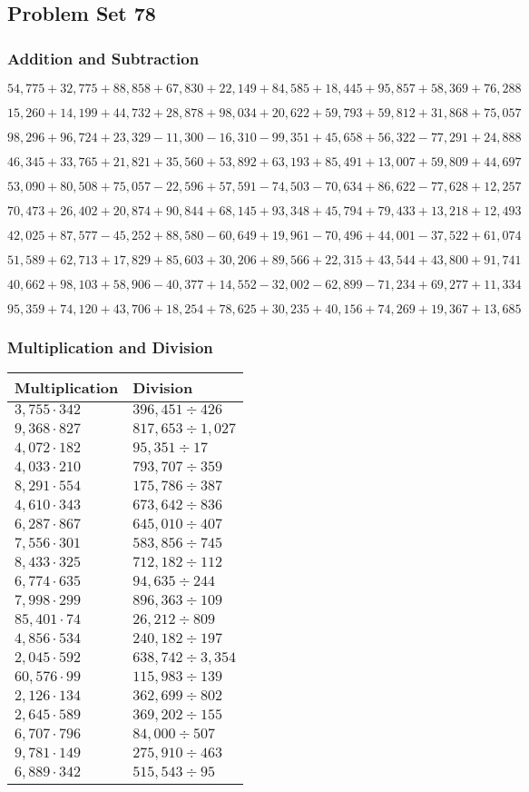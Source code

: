 \hypertarget{problem-set-78}{%
\subsection{Problem Set 78}\label{problem-set-78}}

\hypertarget{addition-and-subtraction-300}{%
\subsubsection{Addition and
Subtraction}\label{addition-and-subtraction-300}}

\(54,775+32,775+88,858+67,830+22,149+84,585+18,445+95,857+58,369+ 76,288\)

\(15,260+14,199+44,732+28,878+98,034+20,622+59,793+59,812+31,868+75,057\)

\(98,296+96,724+23,329-11,300-16,310-99,351+45,658+56,322-77,291+24,888\)

\(46,345+33,765+21,821+35,560+53,892+63,193+85,491+13,007+59,809+44,697\)

\(53,090+80,508+75,057-22,596+57,591-74,503-70,634+86,622-77,628+12,257\)

\(70,473+26,402+20,874+90,844+68,145+93,348+45,794+79,433+13,218+12,493\)

\(42,025+87,577-45,252+88,580-60,649+19,961-70,496+44,001-37,522+61,074\)

\(51,589+62,713+17,829+85,603+30,206+89,566+22,315+43,544+43,800+91,741\)

\(40,662+98,103+58,906-40,377+14,552-32,002-62,899-71,234+69,277+11,334\)

\(95,359+74,120+43,706+18,254+78,625+30,235+40,156+74,269+19,367+13,685\)

\hypertarget{multiplication-and-division-299}{%
\subsubsection{Multiplication and
Division}\label{multiplication-and-division-299}}

\begin{longtable}[]{@{}ll@{}}
\toprule
Multiplication & Division\tabularnewline
\midrule
\endhead
\(3,755\cdot342\) & \(396,451÷426\)\tabularnewline
\(9,368\cdot827\) & \(817,653÷1,027\)\tabularnewline
\(4,072\cdot182\) & \(95,351÷17\)\tabularnewline
\(4,033\cdot210\) & \(793,707÷359\)\tabularnewline
\(8,291\cdot554\) & \(175,786÷387\)\tabularnewline
\(4,610\cdot343\) & \(673,642÷836\)\tabularnewline
\(6,287\cdot867\) & \(645,010÷407\)\tabularnewline
\(7,556\cdot301\) & \(583,856÷745\)\tabularnewline
\(8,433\cdot325\) & \(712,182÷112\)\tabularnewline
\(6,774\cdot635\) & \(94,635÷244\)\tabularnewline
\(7,998\cdot299\) & \(896,363÷109\)\tabularnewline
\(85,401\cdot74\) & \(26,212÷809\)\tabularnewline
\(4,856\cdot534\) & \(240,182÷197\)\tabularnewline
\(2,045\cdot592\) & \(638,742÷3,354\)\tabularnewline
\(60,576\cdot99\) & \(115,983÷139\)\tabularnewline
\(2,126\cdot134\) & \(362,699÷802\)\tabularnewline
\(2,645\cdot589\) & \(369,202÷155\)\tabularnewline
\(6,707\cdot796\) & \(84,000÷507\)\tabularnewline
\(9,781\cdot149\) & \(275,910÷463\)\tabularnewline
\(6,889\cdot342\) & \(515,543÷95\)\tabularnewline
\bottomrule
\end{longtable}

